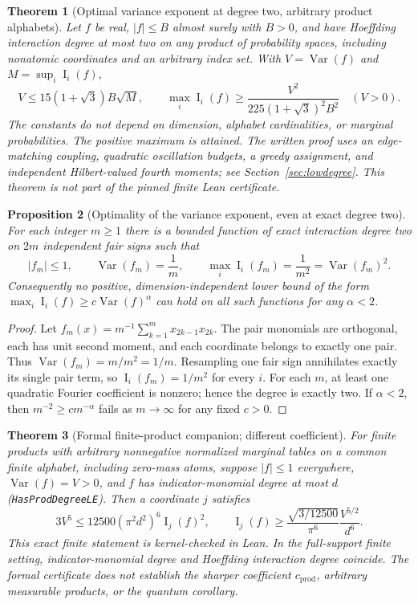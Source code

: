 \documentclass[11pt]{article}
\numberwithin{equation}{section}
\newtheorem{theorem}{Theorem}[section]
\newtheorem{proposition}[theorem]{Proposition}
\theoremstyle{remark}
\newcommand{\Var}{\operatorname{Var}}
\newcommand{\Inf}{\operatorname{I}}
\newcommand{\cprod}{c_{\mathrm{prod}}}
\begin{document}
\begin{theorem}[Optimal variance exponent at degree two, arbitrary product alphabets]\label{thm:quadall}
Let $f$ be real, $|f|\le B$ almost surely with $B>0$, and have Hoeffding interaction degree at most two on \emph{any} product of probability spaces, including nonatomic coordinates and an arbitrary index set. With $V=\Var(f)$ and $M=\sup_i\Inf_i(f)$,
\begin{equation}\label{eq:quadall}
 V\le 15(1+\sqrt3)B\sqrt M,\qquad
 \max_i\Inf_i(f)\ge\frac{V^2}{225(1+\sqrt3)^2 B^2}\quad(V>0).
\end{equation}
The constants do not depend on dimension, alphabet cardinalities, or marginal probabilities. The positive maximum is attained. The written proof uses an edge-matching coupling, quadratic oscillation budgets, a greedy assignment, and independent Hilbert-valued fourth moments; see Section~\ref{sec:lowdegree}. This theorem is not part of the pinned finite Lean certificate.
\end{theorem}

\begin{proposition}[Optimality of the variance exponent, even at exact degree two]\label{prop:quadsharp}
For each integer $m\ge1$ there is a bounded function of \emph{exact} interaction degree two on $2m$ independent fair signs such that
\[
 |f_m|\le1,\qquad \Var(f_m)=\frac1m,\qquad
 \max_i\Inf_i(f_m)=\frac1{m^2}=\Var(f_m)^2.
\]
Consequently no positive, dimension-independent lower bound of the form $\max_i\Inf_i(f)\ge c\Var(f)^\alpha$ can hold on all such functions for any $\alpha<2$.
\end{proposition}
\begin{proof}
Let $f_m(x)=m^{-1}\sum_{k=1}^m x_{2k-1}x_{2k}$. The pair monomials are orthogonal, each has unit second moment, and each coordinate belongs to exactly one pair. Thus $\Var(f_m)=m/m^2=1/m$. Resampling one fair sign annihilates exactly its single pair term, so $\Inf_i(f_m)=1/m^2$ for every $i$. For each $m$, at least one quadratic Fourier coefficient is nonzero; hence the degree is exactly two. If $\alpha<2$, then $m^{-2}\ge c m^{-\alpha}$ fails as $m\to\infty$ for any fixed $c>0$.
\end{proof}

\begin{theorem}[Formal finite-product companion; different coefficient]\label{thm:lean}
For finite products with arbitrary nonnegative normalized marginal tables on a common finite alphabet, including zero-mass atoms, suppose $|f|\le1$ everywhere, $\Var(f)=V>0$, and $f$ has indicator-monomial degree at most $d$ (\texttt{HasProdDegreeLE}). Then a coordinate $j$ satisfies
\begin{equation}\label{eq:lean}
 3V^5\le12500(\pi^2d^2)^6\Inf_j(f)^2,\qquad
 \Inf_j(f)\ge\frac{\sqrt{3/12500}}{\pi^6}\frac{V^{5/2}}{d^6}.
\end{equation}
This exact finite statement is kernel-checked in Lean. In the full-support finite setting, indicator-monomial degree and Hoeffding interaction degree coincide. The formal certificate does \emph{not} establish the sharper coefficient $\cprod$, arbitrary measurable products, or the quantum corollary.
\end{theorem}
\end{document}
